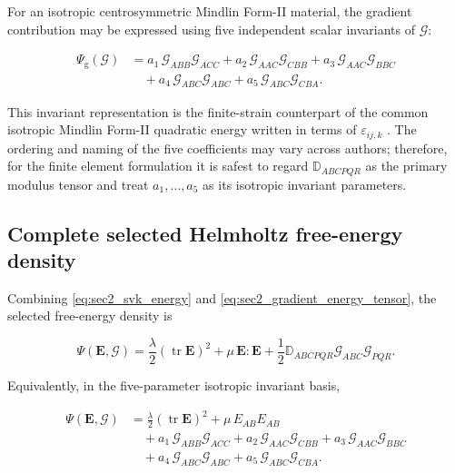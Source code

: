 \documentclass[11pt]{article}
\DeclareMathOperator{\tr}{tr}
\begin{document}
For an isotropic centrosymmetric Mindlin Form-II material, the gradient contribution may be expressed using five independent scalar invariants of $\bm{\mathcal{G}}$:

\begin{align}
\Psi_{\mathrm{g}}(\bm{\mathcal{G}})
&=
a_1\,\mathcal{G}_{ABB}\mathcal{G}_{ACC}
+
a_2\,\mathcal{G}_{AAC}\mathcal{G}_{CBB}
+
a_3\,\mathcal{G}_{AAC}\mathcal{G}_{BBC}
\nonumber\\
&\quad
+
a_4\,\mathcal{G}_{ABC}\mathcal{G}_{ABC}
+
a_5\,\mathcal{G}_{ABC}\mathcal{G}_{CBA}.
\label{eq:sec2_gradient_energy_invariants}
\end{align}

This invariant representation is the finite-strain counterpart of the common isotropic Mindlin Form-II quadratic energy written in terms of $\varepsilon_{ij,k}$ \cite{Mindlin1964,MindlinEshel1968,LazarPo2018}. The ordering and naming of the five coefficients may vary across authors; therefore, for the finite element formulation it is safest to regard $\mathbb{D}_{ABCPQR}$ as the primary modulus tensor and treat $a_1,\ldots,a_5$ as its isotropic invariant parameters.

\subsection{Complete selected Helmholtz free-energy density}

Combining \eqref{eq:sec2_svk_energy} and \eqref{eq:sec2_gradient_energy_tensor}, the selected free-energy density is

\begin{equation}
\boxed{
\Psi(\mathbf{E},\bm{\mathcal{G}})
=
\frac{\lambda}{2}\left(\tr\mathbf{E}\right)^2
+
\mu\,\mathbf{E}:\mathbf{E}
+
\frac{1}{2}
\mathbb{D}_{ABCPQR}
\mathcal{G}_{ABC}\mathcal{G}_{PQR}.
}
\label{eq:sec2_complete_energy_tensor}
\end{equation}

Equivalently, in the five-parameter isotropic invariant basis,

\begin{align}
\Psi(\mathbf{E},\bm{\mathcal{G}})
&=
\frac{\lambda}{2}\left(\tr\mathbf{E}\right)^2
+
\mu\,E_{AB}E_{AB}
\nonumber\\
&\quad
+
a_1\,\mathcal{G}_{ABB}\mathcal{G}_{ACC}
+
a_2\,\mathcal{G}_{AAC}\mathcal{G}_{CBB}
+
a_3\,\mathcal{G}_{AAC}\mathcal{G}_{BBC}
\nonumber\\
&\quad
+
a_4\,\mathcal{G}_{ABC}\mathcal{G}_{ABC}
+
a_5\,\mathcal{G}_{ABC}\mathcal{G}_{CBA}.
\label{eq:sec2_complete_energy_invariants}
\end{align}
\end{document}
